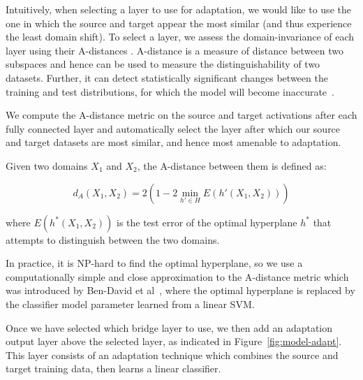 Intuitively, when selecting a layer to use for adaptation, we would like to use
the one in which the source and target appear the most similar (and thus
experience the least domain shift).
To select a layer, we assess the domain-invariance of each layer using their A-distances
\cite{adist}. A-distance is a measure of distance between two subspaces and hence can be used to measure the distinguishability of two datasets. Further, it can detect statistically significant 
changes between the training and test distributions, for which the model will become inaccurate~\cite{adist}.

We compute the A-distance metric on the source and target activations after each fully 
connected layer
and automatically select the  layer after which
our source and target datasets are most similar, and hence most amenable to adaptation.

Given two domains $X_1$ and $X_2$, the A-distance between them is defined as:

\begin{equation}
  d_A(X_1, X_2) = 2 \left( 1 - 2 \min_{h' \in H} E(h'(X_1, X_2))\right)
\end{equation}


where $E(h^*(X_1, X_2))$ is the test error of the optimal hyperplane $h^*$ that attempts to
distinguish between the two domains.

In practice, it is NP-hard to find the optimal hyperplane, so we use a computationally simple and 
close approximation to the A-distance metric which was introduced by Ben-David et al~\cite{adist-comp}, 
where the optimal hyperplane is replaced by the classifier model parameter learned from a linear SVM.

Once we have selected which bridge layer to use, we then add an adaptation output layer above the selected layer, as indicated in Figure~\ref{fig:model-adapt}. This layer
consists of an adaptation technique which combines the source and target
training data, then learns a linear classifier.

